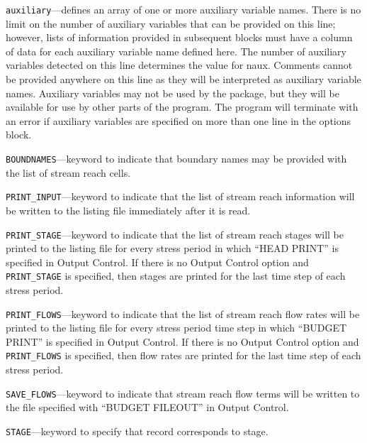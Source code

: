 
\item \texttt{auxiliary}---defines an array of one or more auxiliary variable names.  There is no limit on the number of auxiliary variables that can be provided on this line; however, lists of information provided in subsequent blocks must have a column of data for each auxiliary variable name defined here.   The number of auxiliary variables detected on this line determines the value for naux.  Comments cannot be provided anywhere on this line as they will be interpreted as auxiliary variable names.  Auxiliary variables may not be used by the package, but they will be available for use by other parts of the program.  The program will terminate with an error if auxiliary variables are specified on more than one line in the options block.

\item \texttt{BOUNDNAMES}---keyword to indicate that boundary names may be provided with the list of stream reach cells.

\item \texttt{PRINT\_INPUT}---keyword to indicate that the list of stream reach information will be written to the listing file immediately after it is read.

\item \texttt{PRINT\_STAGE}---keyword to indicate that the list of stream reach stages will be printed to the listing file for every stress period in which ``HEAD PRINT'' is specified in Output Control.  If there is no Output Control option and \texttt{PRINT\_STAGE} is specified, then stages are printed for the last time step of each stress period.

\item \texttt{PRINT\_FLOWS}---keyword to indicate that the list of stream reach flow rates will be printed to the listing file for every stress period time step in which ``BUDGET PRINT'' is specified in Output Control.  If there is no Output Control option and \texttt{PRINT\_FLOWS} is specified, then flow rates are printed for the last time step of each stress period.

\item \texttt{SAVE\_FLOWS}---keyword to indicate that stream reach flow terms will be written to the file specified with ``BUDGET FILEOUT'' in Output Control.

\item \texttt{STAGE}---keyword to specify that record corresponds to stage.

